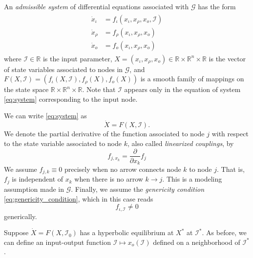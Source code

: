 \documentclass[a4paper,fleqn]{cas-dc}
\newcommand{\R}{\mathbb{R}}
\newcommand{\II}{{\mathcal I}}
\newcommand{\END}{\hfill\mbox{\raggedright \mbox{\raisebox{2pt}{\scalebox{0.6}{$\Diamond$}}}}\medskip}
\begin{document}
An {\em admissible system} of differential equations associated with $\mathcal{G}$ has the form
\begin{align}\label{eq:system}
\begin{split}
    \dot{x}_\iota &= f_\iota(x_\iota,x_\rho,x_o,\II) \\
    \dot{x}_\rho &= f_\rho(x_\iota,x_\rho,x_o) \\
    \dot{x}_o &= f_o(x_\iota,x_\rho,x_o)
\end{split}
\end{align}
where $\II\in\R$ is the input parameter, $X = (x_\iota,x_\rho,x_o) \in \R\times \R^n \times \R$ is the vector of state variables associated to nodes in $\mathcal{G}$, and $F(X,\II) = (f_\iota(X,\II),f_\rho(X),f_o(X))$ is a smooth family of mappings on the state space $\R\times \R^n \times \R$. 
Note that $\II$ appears only in the equation of system \eqref{eq:system} corresponding to the input node.

We can write \eqref{eq:system} as 
\[
 \dot{X} = F(X,\II).
\]
We denote the partial derivative of the function associated to node $j$ with respect to the state variable associated to node $k$, also called \emph{linearized couplings}, by 
\[
f_{j,x_k} = \frac{\partial}{\partial x_k} f_j
\]
We assume $f_{j,k} \equiv 0$ precisely when no arrow connects node $k$ to node $j$. 
That is, $f_j$ is independent of $x_k$ when there is no arrow $k\to j$.  
This is a modeling assumption made in $\mathcal{G}$.
Finally, we assume the \emph{genericity condition} \eqref{eq:genericity_condition}, which in this case reads
\[
 f_{\iota,\II} \neq 0
\]
generically. 

Suppose $\dot{X} = F(X,\II_0)$ has a hyperbolic equilibrium at $X^*$ at $\II^*$.
As before, we can define an input-output function $\II \mapsto x_o(\II)$ defined on a neighborhood of $\II^*$. 

\end{document}

